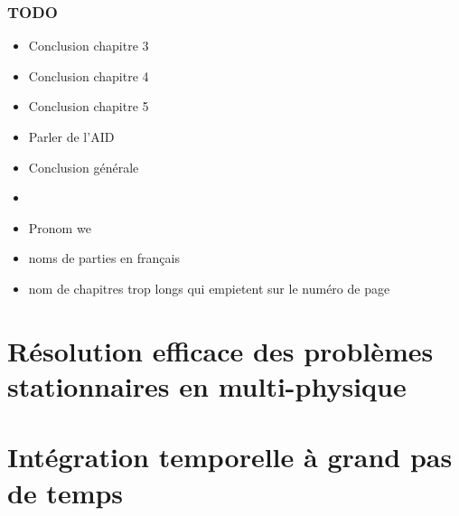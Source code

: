 



\makeflyleaf
{}

\tableofcontents
{}



\section*{TODO}
\begin{itemize}
  \item Conclusion chapitre 3
  \item Conclusion chapitre 4
  \item Conclusion chapitre 5
  \item Parler de l'AID
  \item Conclusion générale
  \item {}
  \item Pronom we
  \item noms de parties en français
  \item nom de chapitres trop longs qui empietent sur le numéro de page
\end{itemize}


\part{Résolution efficace des problèmes stationnaires en multi-physique}

  

  

  

\part{Intégration temporelle à grand pas de temps}

    

    







